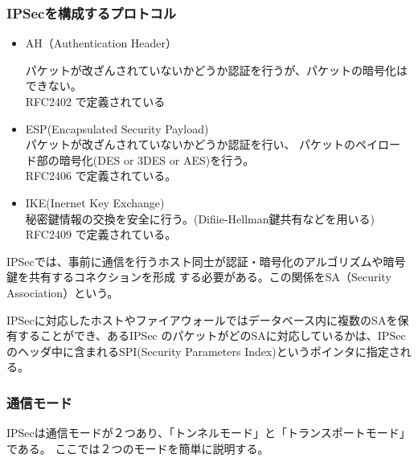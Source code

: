 \documentclass[11pt,a4j,titlepage]{jreport}
\begin{document}
\subsubsection{IPSecを構成するプロトコル}

\begin{itemize}
    \item AH（Authentication Header）\mbox{}\par
    パケットが改ざんされていないかどうか認証を行うが、パケットの暗号化はできない。\\RFC2402 \cite{RFC2402}で定義されている

    \item ESP(Encapsulated Security Payload)\mbox{}\\
    パケットが改ざんされていないかどうか認証を行い、
    パケットのペイロード部の暗号化(DES or 3DES or AES)を行う。\\RFC2406 \cite{RFC2406}で定義されている。 
    \item IKE(Inernet Key Exchange)\mbox{}\\
    秘密鍵情報の交換を安全に行う。(Difiie-Hellman鍵共有などを用いる)
    \\RFC2409 \cite{RFC2409}で定義されている。
\end{itemize}

IPSecでは、事前に通信を行うホスト同士が認証・暗号化のアルゴリズムや暗号鍵を共有するコネクションを形成
する必要がある。この関係をSA（Security Association）という。\par
IPSecに対応したホストやファイアウォールではデータベース内に複数のSAを保有することができ、あるIPSec
のパケットがどのSAに対応しているかは、IPSecのヘッダ中に含まれるSPI(Security Parameters Index)というポインタに指定される。
\par 
\subsubsection*{通信モード}
IPSecは通信モードが２つあり、「トンネルモード」と「トランスポートモード」である。
ここでは２つのモードを簡単に説明する。
\end{document}
